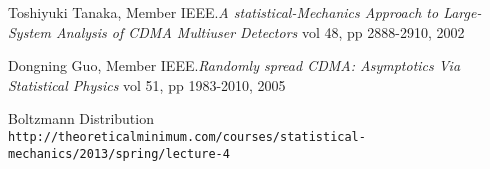 \documentclass[letterpaper,english,10pt]{article}
\begin{document}
\newpage

\begin{thebibliography}{9}
Toshiyuki Tanaka, Member IEEE.\textit{A statistical-Mechanics Approach to Large-System Analysis of CDMA Multiuser Detectors}
vol 48, pp 2888-2910, 2002

Dongning Guo, Member IEEE.\textit{Randomly spread CDMA: Asymptotics Via Statistical Physics}
vol 51, pp 1983-2010, 2005

Boltzmann Distribution
\\\texttt{http://theoreticalminimum.com/courses/statistical-mechanics/2013/spring/lecture-4}

\end{thebibliography}
\end{document}
